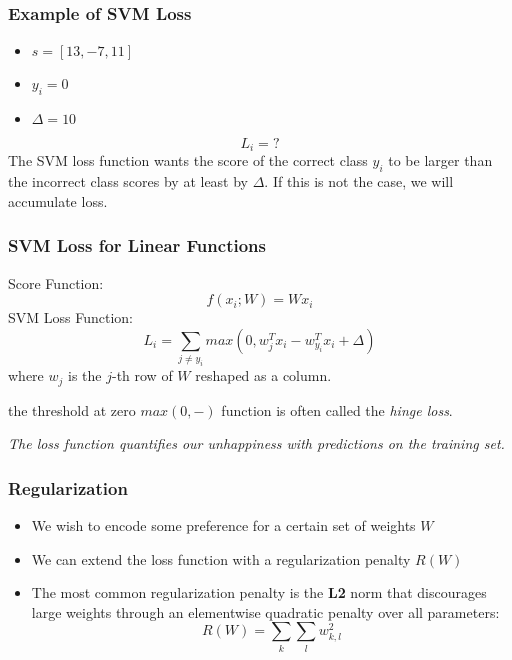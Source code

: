 \documentclass[14 pt]{beamer}
\let\olditem\item
\renewcommand{\item}{\olditem\vspace{4pt}}
\begin{document}
\begin{frame}
  \frametitle{Example of SVM Loss}
  \begin{itemize}
  \item $s=[13, -7, 11]$
  \item $y_i=0$
  \item $\Delta=10$
  \end{itemize}
  \begin{displaymath}
    L_i = ?
  \end{displaymath}
  The SVM loss function wants the score of the correct class $y_i$ to be
  larger than the incorrect class scores by at least by $\Delta$. If this
  is not the case, we will accumulate loss.
\end{frame}

\begin{frame}
  \frametitle{SVM Loss for Linear  Functions}
Score Function:
  \begin{displaymath}
    f(x_i; W) = Wx_i
  \end{displaymath}
SVM Loss Function:
  \begin{displaymath}
         L_i = \sum_{j\neq y_i}max(0, w_j^Tx_i-w_{y_i}^Tx_i+\Delta)
  \end{displaymath}
where $w_j$ is the $j$-th row of $W$ reshaped as a column.

the threshold at zero $max(0,-)$ function is often called the \emph{hinge
  loss}.
\end{frame}
\begin{frame}
  \begin{centering}
    \emph{The loss function quantifies our unhappiness with predictions on
      the training set.}
  \end{centering}
 \end{frame}

 \begin{frame}
   \frametitle{Regularization}
   \begin{itemize}
\item We wish to encode some preference for a certain set of weights $W$
\item We can extend the loss function with a regularization penalty $R(W)$
\item The most common regularization penalty is the \textbf{L2} norm that discourages large weights through an elementwise quadratic penalty over all parameters:
  \begin{displaymath}
    R(W) = \sum_k\sum_lw_{k,l}^2
  \end{displaymath}
   \end{itemize}
 \end{frame}
\end{document}
